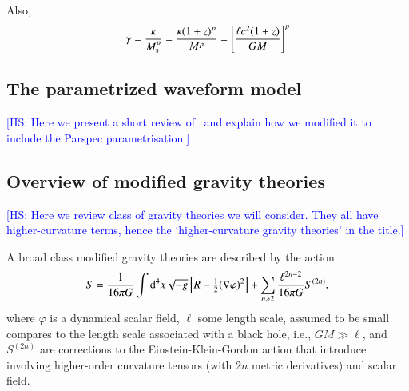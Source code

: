 \documentclass[twocolumn,prd,aps,superscriptaddress,preprintnumbers,tightenlines,showpacs,nofootinbib,eqsecnum,amsfonts,amsmath,longbibliography]{revtex4-2}
\newcommand{\dd}{{\rm d}}
\newcommand{\hs}[1]{{\textcolor{blue}{{[HS: #1]}} }}
\begin{document}
Also,
%
\begin{equation}
\gamma = \frac{\kappa}{M_{\rm s}^{p}} = \frac{\kappa (1 + z)^{p}}{M^{p}}
= \left[
\frac{\ell c^2 (1 + z)}{G M}
\right]^{p}
\end{equation}
%

\subsection{The parametrized waveform model}
\label{sec:review_pSEOB}

\hs{Here we present a short review of~\cite{Brito:2018rfr,Ghosh:2021mrv} and
explain how we modified it to include the {\sc Parspec} parametrisation.}

\subsection{Overview of modified gravity theories}
\label{sec:review_theories}

\hs{Here we review class of gravity theories we will consider.
They all have higher-curvature terms, hence the `higher-curvature gravity theories'
in the title.}

A broad class modified gravity theories are described by the action
%
\begin{equation}
S = \frac{1}{16 \pi G} \int \dd^4x \sqrt{-g}
\left[ R
- \tfrac{1}{2}(\nabla \varphi)^2
\right]
+
\sum_{n \geqslant 2} \frac{\ell^{2n - 2}}{16 \pi G} S^{(2n)},
\end{equation}
%
where $\varphi$ is a dynamical scalar field, $\ell$ some length scale, assumed
to be small compares to the length scale associated with a black hole, i.e.,
$GM \gg \ell$, and $S^{(2n)}$ are corrections to the Einstein-Klein-Gordon
action that introduce involving higher-order curvature tensors (with $2n$
metric derivatives) and scalar field.
\end{document}

